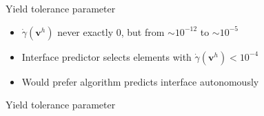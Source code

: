 \documentclass{beamer}  %
\newcommand{\vv}{\mathbf{v}}
\begin{document}
\begin{frame}{Yield tolerance parameter}
    \begin{itemize}
        \item $\dot\gamma(\vv^h)$ never exactly $0$, but from $\sim 10^{-12}$ to $\sim 10^{-5}$
        \item Interface predictor selects elements with $\dot\gamma(\vv^h)<10^{-4}$
        \item Would prefer algorithm predicts interface autonomously
    \end{itemize}
\end{frame}

\begin{frame}{Yield tolerance parameter}
    \begin{figure}
        \begin{overprint}
\end{overprint}
\end{figure}
\end{frame}
\end{document}
